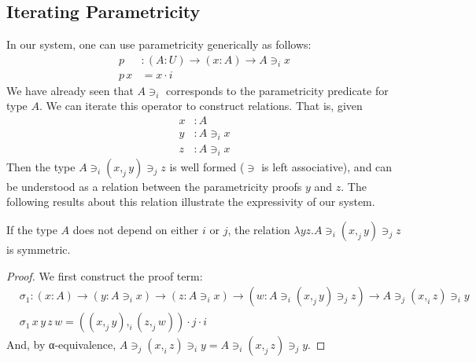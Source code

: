 \documentclass[english]{PaperTools/latex/lipics}
\newcommand\CP[3]{(#2,_{#1} #3)}
\newcommand\param[1]{\!\cdot\!#1}
\newcommand\op[1]{∋_{#1}}
\begin{document}
\subsection{Iterating Parametricity}
In our system, one can use parametricity generically as follows:
\begin{align*}
p &: (A:U) → (x:A) → A \op i x\\
p\, x &= x\param i
\end{align*}
We have already seen that $A \op i $ corresponds to the parametricity
predicate for type $A$. We can iterate this operator to construct
relations. That is, given
\begin{align*}
  x & :A \\
  y & : A \op i x\\
  z & : A \op i x
\end{align*}
Then the type $A \op i \CP j x y \op j z$ is well formed ($∋$ is left
associative), and can be understood as a relation
between the parametricity proofs $y$ and $z$. The following results about this relation illustrate the expressivity of our system.
\begin{theorem}
If the type $A$ does not depend on either $i$ or $j$, the relation $λy z. A \op i \CP j x y \op j z$ is symmetric.
\end{theorem}
\begin{proof}
  We first construct the proof term:
  \begin{align*}
    &\sigma_1 : (x:A) → (y : A \op i x) → (z : A \op i x) → (w : A \op i \CP j x y \op j z) → A \op j \CP i x z \op i y \\
    &\sigma_1\, x\, y\, z\, w = \CP i {\CP j x y}{\CP j z w} \param j \param i
  \end{align*}
  And, by α-equivalence, $A \op j \CP i x z \op i y = A \op i \CP j x z \op j y$.
\end{proof}
\end{document}
